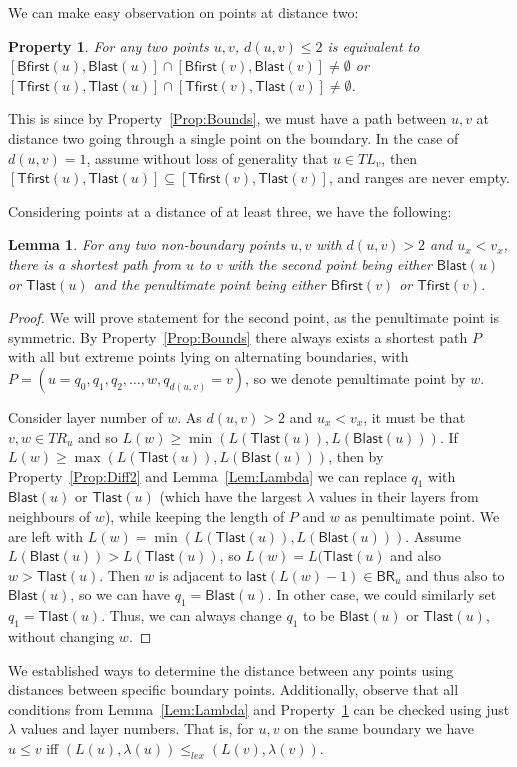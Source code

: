 \documentclass[a4paper,11pt]{article}
\newcommand{\lam}{\lambda}
\newcommand{\BR}{\mathsf{BR}}
\newcommand{\last}{\mathsf{last}}
\newcommand{\Blast}{\mathsf{Blast}}
\newcommand{\Bfirst}{\mathsf{Bfirst}}
\newcommand{\Tlast}{\mathsf{Tlast}}
\newcommand{\Tfirst}{\mathsf{Tfirst}}
\newtheorem{lemma}[theorem]{Lemma}
\newtheorem{property}[theorem]{Property}
\begin{document}
We can make easy observation on points at distance two:
\begin{property}
For any two points $u,v$, $d(u,v) \leq 2$ is equivalent to \newline $[\Bfirst(u),\Blast(u)] \cap [\Bfirst(v),\Blast(v)] \neq \emptyset$
or $[\Tfirst(u),\Tlast(u)] \cap [\Tfirst(v),\Tlast(v)] \neq \emptyset$.
\label{Prop:Dist2}
\end{property}
This is since by Property~\ref{Prop:Bounds}, we must have a path between $u,v$ at distance two going through a single point on the boundary.
In the case of $d(u,v)=1$, assume without loss of generality that $u \in TL_v$, then
$[\Tfirst(u),\Tlast(u)] \subseteq [\Tfirst(v),\Tlast(v)]$, and ranges are never empty.

Considering points at a distance of at least three, we have the following:
\begin{lemma}
For any two non-boundary points $u,v$ with $d(u,v)>2$ and $u_x<v_x$, there is a shortest path from $u$ to $v$ with the second point being
either $\Blast(u)$ or $\Tlast(u)$ and the penultimate point being either $\Bfirst(v)$ or $\Tfirst(v)$.
\label{Lem:Dist3}
\end{lemma}
\begin{proof}
We will prove statement for the second point, as the penultimate point is symmetric.
By Property~\ref{Prop:Bounds} there always exists a shortest path $P$ with all but extreme points lying on alternating boundaries,
with $P=(u=q_0,q_1,q_2,\ldots,w,q_{d(u,v)}=v)$, so we denote penultimate point by $w$.

Consider layer number of $w$.
As $d(u,v)>2$ and $u_x<v_x$, it must be that $v,w \in TR_u$ and so $L(w) \geq \min(L(\Tlast(u)),L(\Blast(u)))$.
If $L(w) \geq \max(L(\Tlast(u)),L(\Blast(u)))$, then by Property~\ref{Prop:Diff2} and Lemma~\ref{Lem:Lambda}
we can replace $q_1$ with $\Blast(u)$ or $\Tlast(u)$ (which have the largest $\lam$ values in their layers from
neighbours of $w$), while keeping the length of $P$ and $w$ as penultimate point.
We are left with $L(w) = \min(L(\Tlast(u)),L(\Blast(u)))$.
Assume $L(\Blast(u))>L(\Tlast(u))$, so $L(w)=L(\Tlast(u)$ and also $w>\Tlast(u)$.
Then $w$ is adjacent to $\last(L(w)-1) \in \BR_u$ and thus also to $\Blast(u)$, so we can have $q_1=\Blast(u)$.
In other case, we could similarly set $q_1=\Tlast(u)$.
Thus, we can always change $q_1$ to be $\Blast(u)$ or $\Tlast(u)$, without changing $w$.
\end{proof}

We established ways to determine the distance between any points using distances between specific boundary points.
Additionally, observe that all conditions from Lemma~\ref{Lem:Lambda} and Property~\ref{Prop:Dist2}
can be checked using just $\lam$ values and layer numbers.
That is, for $u,v$ on the same boundary we have $u \leq v$ iff $(L(u),\lam(u)) \leq_{lex} (L(v),\lam(v))$. 
\end{document}
